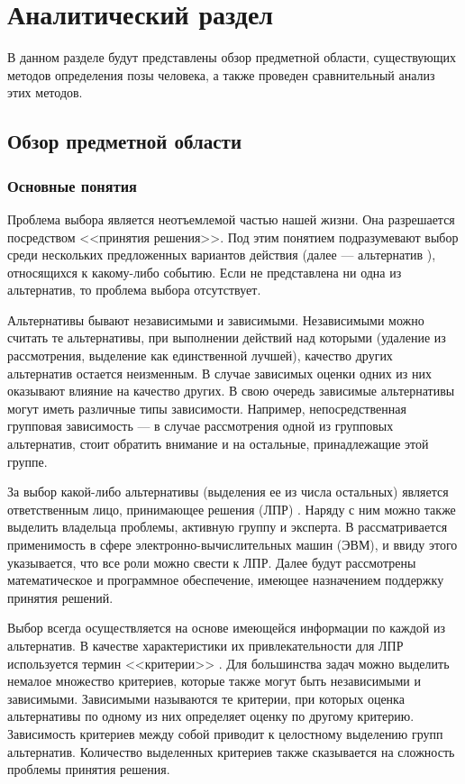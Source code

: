 
\chapter{Аналитический раздел}

В данном разделе будут представлены обзор предметной области, существующих методов определения позы человека, а также проведен сравнительный анализ этих методов.

\section{Обзор предметной области}

\subsection{Основные понятия}

Проблема выбора является неотъемлемой частью нашей жизни. Она разрешается посредством <<принятия решения>>. Под этим понятием подразумевают выбор среди нескольких предложенных вариантов действия (далее --- альтернатив \cite{Larychev}), относящихся к какому-либо событию. Если не представлена ни одна из альтернатив, то проблема выбора отсутствует.

Альтернативы бывают независимыми и зависимыми. Независимыми можно считать те альтернативы, при выполнении действий над которыми (удаление из рассмотрения, выделение как единственной лучшей), качество других альтернатив остается неизменным. В случае зависимых оценки одних из них оказывают влияние на качество других. В свою очередь зависимые альтернативы могут иметь различные типы зависимости. Например, непосредственная групповая зависимость --- в случае рассмотрения одной из групповых альтернатив, стоит обратить внимание и на остальные, принадлежащие этой группе.

За выбор какой-либо альтернативы (выделения ее из числа остальных) является ответственным лицо, принимающее решения (ЛПР) \cite{Larychev}. Наряду с ним можно также выделить владельца проблемы, активную группу и эксперта. В \cite{Larychev}
рассматривается применимость в сфере электронно-вычислительных машин (ЭВМ), и ввиду этого указывается, что все роли можно свести к ЛПР. Далее будут рассмотрены математическое и программное обеспечение, имеющее назначением поддержку принятия решений.

Выбор всегда осуществляется на основе имеющейся информации по каждой из альтернатив. В качестве характеристики их привлекательности для ЛПР используется термин <<критерии>> \cite{Larychev}. Для большинства задач можно выделить немалое множество критериев, которые также могут быть независимыми и зависимыми. Зависимыми называются те критерии, при которых оценка альтернативы по одному из них определяет оценку по другому критерию. Зависимость критериев между собой приводит к целостному выделению групп альтернатив. Количество выделенных критериев также сказывается на сложность проблемы принятия решения.

